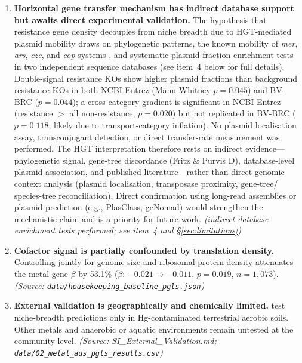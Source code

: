 \documentclass[times]{zHenriquesLab-StyleBioRxiv}
\begin{document}
\begin{enumerate}
\item \textbf{Horizontal gene transfer mechanism has indirect database support but awaits direct experimental validation.}
The hypothesis that resistance gene density decouples from niche breadth due to
HGT-mediated plasmid mobility draws on phylogenetic patterns, the known
mobility of \textit{mer}, \textit{ars}, \textit{czc}, and \textit{cop} systems
\cite{silver1998,coombs2004,pal2015}, and systematic plasmid-fraction enrichment
tests in two independent sequence databases (see item~4 below for full details).
Double-signal resistance KOs show higher plasmid fractions than background resistance KOs
in both NCBI Entrez (Mann-Whitney $p = 0.045$) and BV-BRC ($p = 0.044$); a
cross-category gradient is significant in NCBI Entrez (resistance $>$ all non-resistance,
$p = 0.020$) but not replicated in BV-BRC ($p = 0.118$; likely due to transport-category
inflation). No plasmid localisation assay, transconjugant detection, or direct
transfer-rate measurement was performed. The HGT interpretation therefore rests on
indirect evidence---phylogenetic signal, gene-tree discordance (Fritz \& Purvis D),
database-level plasmid association, and published literature---rather than direct
genomic context analysis (plasmid localisation, transposase proximity, gene-tree/
species-tree reconciliation). Direct confirmation using long-read assemblies or
plasmid prediction (e.g., PlasClass, geNomad) would strengthen the mechanistic claim
and is a priority for future work.
\textit{(indirect database enrichment tests performed; see item~4 and \S\ref{sec:limitations})}

\item \textbf{Cofactor signal is partially confounded by translation density.}
Controlling jointly for genome size and ribosomal protein density attenuates the
metal-gene $\beta$ by 53.1\% ($\beta$: $-0.021 \to -0.011$, $p = 0.019$, $n = 1{,}073$).
\textit{(Source: \texttt{data/housekeeping\_baseline\_pgls.json})}

\item \textbf{External validation is geographically and chemically limited.}
\cite{frossard2017,frossard2018,li2022} test niche-breadth predictions only in
Hg-contaminated terrestrial aerobic soils. Other metals and anaerobic or aquatic
environments remain untested at the community level.
\textit{(Source: SI\_External\_Validation.md; \texttt{data/02\_metal\_aus\_pgls\_results.csv})}


\end{enumerate}
\end{document}
